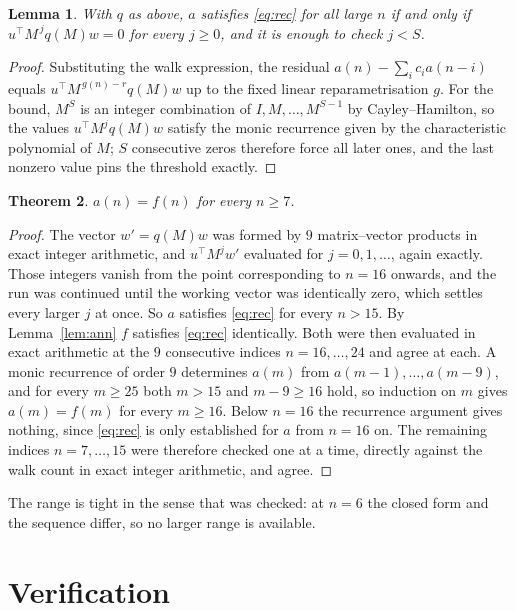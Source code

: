 \documentclass[11pt,a4paper]{article}
\theoremstyle{plain}
\newtheorem{theorem}{Theorem}
\newtheorem{lemma}[theorem]{Lemma}
\theoremstyle{definition}
\begin{document}
\begin{lemma}\label{lem:crit}
With $q$ as above, $a$ satisfies \eqref{eq:rec} for all large $n$ if and only if
$u^{\!\top}M^{\,j}q(M)w=0$ for every $j\ge0$, and it is enough to check $j<S$.
\end{lemma}

\begin{proof}
Substituting the walk expression, the residual $a(n)-\sum_ic_ia(n-i)$ equals
$u^{\!\top}M^{\,g(n)-r}q(M)w$ up to the fixed linear reparametrisation $g$. For the bound,
$M^{S}$ is an integer combination of $I,M,\dots,M^{S-1}$ by Cayley--Hamilton, so the values
$u^{\!\top}M^{j}q(M)w$ satisfy the monic recurrence given by the characteristic polynomial of
$M$; $S$ consecutive zeros therefore force all later ones, and the last nonzero value pins the
threshold exactly.
\end{proof}

\begin{theorem}
$a(n)=f(n)$ for every $n\ge7$.
\end{theorem}

\begin{proof}
The vector $w'=q(M)w$ was formed by $9$ matrix--vector products in exact integer
arithmetic, and $u^{\!\top}M^{j}w'$ evaluated for $j=0,1,\dots$, again exactly. Those integers
vanish from the point corresponding to $n=16$ onwards, and the run was continued until the
working vector was identically zero, which settles every larger $j$ at once. So $a$ satisfies
\eqref{eq:rec} for every $n>15$. By Lemma~\ref{lem:ann} $f$ satisfies \eqref{eq:rec}
identically. Both were then evaluated in exact arithmetic at the $9$ consecutive indices
$n=16,\dots,24$ and agree at each. A monic recurrence of order $9$
determines $a(m)$ from $a(m-1),\dots,a(m-9)$, and for every $m\ge25$ both
$m>15$ and $m-9\ge16$ hold, so induction on $m$ gives $a(m)=f(m)$ for every
$m\ge16$.
Below $n=16$ the recurrence argument gives nothing, since \eqref{eq:rec} is only
established for $a$ from $n=16$ on. The remaining indices $n=7,\dots,15$ were
therefore checked one at a time, directly against the walk count in exact integer arithmetic,
and agree.
\end{proof}

The range is tight in the sense that was checked: at $n=6$ the closed form and the sequence differ, so no larger range is available.

\section{Verification}
\end{document}
